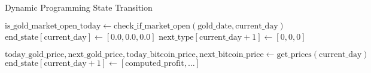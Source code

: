 \documentclass{article}
\begin{document}
\begin{algorithm}
\caption{Dynamic Programming State Transition}
\begin{algorithmic}[1]
    \State$\text{is_gold\_market\_open\_today} \gets \text{check\_if\_market\_open}(\text{gold\_date}, \text{current\_day})$
    \State$\text{end\_state}[\text{current\_day}] \gets [0.0, 0.0, 0.0]$
    \State$\text{next\_type}[\text{current\_day} + 1] \gets [0, 0, 0]$

        \State{}
    \Else\State{} 
    \EndIf
        \State$\text{today\_gold\_price}, \text{next\_gold\_price}, \text{today\_bitcoin\_price}, \text{next\_bitcoin\_price} \gets \text{get\_prices}(\text{current\_day})$
        \State$\text{end\_state}[\text{current\_day} + 1] \gets [\text{computed\_profit}, \ldots]$
\EndFor
\end{algorithmic}
\end{algorithm}
\end{document}
